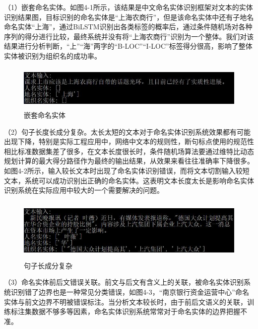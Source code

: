 \documentclass[winfonts,master,oneside,nobackinfo]{njuthesis}
\begin{document}
（1）嵌套命名实体。如图4-1所示，该结果是中文命名实体识别框架对文本的实体识别结果图，目标识别的命名实体是“上海农商行”，但是该命名实体中还有子地名命名实体“上海”，通过BiLSTM识别出各类标签的概率后，通过条件随机场对各种序列的得分进行比较，最终系统并没有将“上海农商行”识别为一个整体。我们对该结果进行分析判断，“上”“海”两字的“B-LOC”“I-LOC”标签得分很高，影响了整体实体被识别为组织名的成功率。

\begin{figure}[H]
\centering
\begin{minipage}[t]{\textwidth}
\includegraphics[width=1\textwidth,height=2.14cm]{./figure/嵌套命名实体.jpg}
\caption{嵌套命名实体}
\label{lab:1}
\end{minipage}
\end{figure}

（2）句子长度长成分复杂。太长太短的文本对于命名实体识别系统效果都有可能出现下降，特别是实际工程应用中，网络中文本的规则性，断句标点使用的规范性相比标准数据集差了很多，在文本长度很长时，条件随机场算法要通过维特比动态规划计算的最大得分路径作为最终的输出结果，从效果来看往往准确率下降很多。如图4-2所示，输入较长文本时出现了命名实体识别错误，而将文本切割输入较短文本，系统可以成功识别出正确的命名实体。这表明文本长度太长是影响命名实体识别系统在实际应用中较大的一个需要解决的问题。


\begin{figure}[H]
\centering
\begin{minipage}[t]{\textwidth}
\includegraphics[width=1\textwidth,height=3cm]{./figure/句子长成分复杂.jpg}
\caption{句子长成分复杂}
\label{lab:1}
\end{minipage}
\end{figure}

（3）命名实体前后文错误关联。前文与后文有含义上的关联，被命名实体识别系统识别错了边界也是一种常见分类错误，如图4-3，“南京银行资金运营中心”命名实体与前文边界不明被错误标注。当分析文本较长时，由于前后文语义的关联，训练标注集数据不够多等因素，命名实体识别系统常常对于命名实体的边界把握不准。
\end{document}
